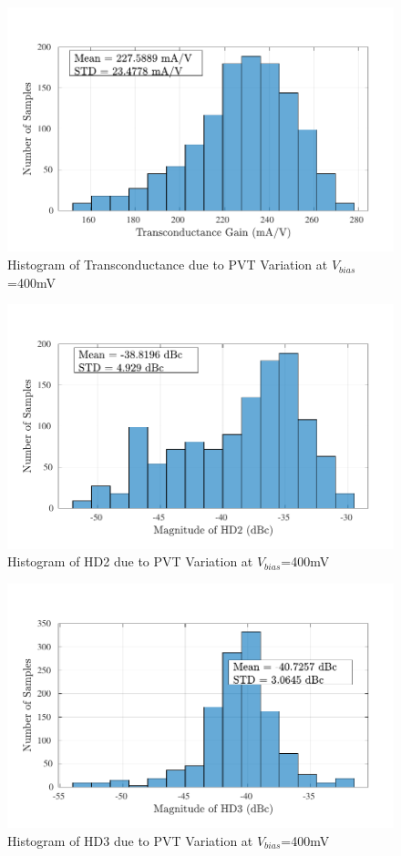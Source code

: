 \begin{figure} [H]
\centering
\includegraphics[scale=1]{Figures/Corners/Overall/PVT_Mid/PDFs/PVT_Mid_gm.pdf}
\caption{Histogram of Transconductance due to PVT Variation at $V_{bias}$=400mV}
\end{figure}

\begin{figure} [H]
\centering
\includegraphics[scale=1]{Figures/Corners/Overall/PVT_Mid/PDFs/PVT_Mid_hd2.pdf}
\caption{Histogram of HD2 due to PVT Variation at $V_{bias}$=400mV}
\end{figure}

\begin{figure} [H]
\centering
\includegraphics[scale=1]{Figures/Corners/Overall/PVT_Mid/PDFs/PVT_Mid_hd3.pdf}
\caption{Histogram of HD3 due to PVT Variation at $V_{bias}$=400mV}
\end{figure}

